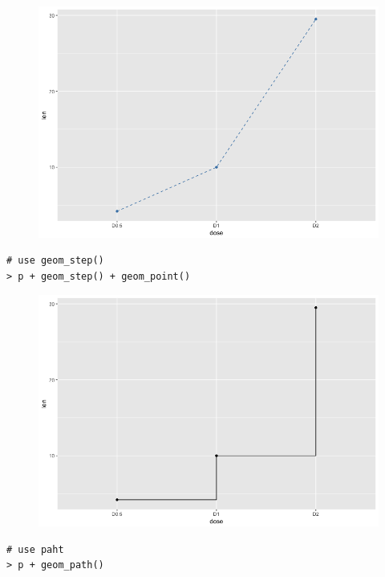 \begin{figure}[H]\begin{center}\includegraphics[scale=1 ]{ilu/bg120.png}\end{center}\end{figure}
\begin{lstlisting}[language=html]
# use geom_step()
> p + geom_step() + geom_point()
\end{lstlisting}
\begin{figure}[H]\begin{center}\includegraphics[scale=1 ]{ilu/bg121.png}\end{center}\end{figure}
\begin{lstlisting}[language=html]
# use paht
> p + geom_path() 
\end{lstlisting}
